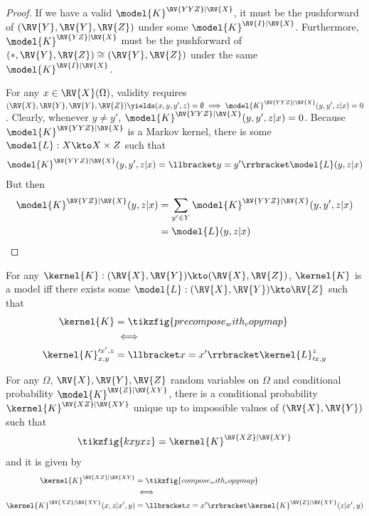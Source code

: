 \begin{proof}
If we have a valid $\model{K}^{\RV{YYZ}|\RV{X}}$, it must be the pushforward of $(\RV{Y},\RV{Y},\RV{Z})$ under some $\model{K}^{\RV{I}|\RV{X}}$. Furthermore, $\model{K}^{\RV{YZ}|\RV{X}}$ must be the pushforward of $(*,\RV{Y},\RV{Z})\cong (\RV{Y},\RV{Z})$ under the same $\model{K}^{\RV{I}|\RV{X}}$.

For any $x\in \RV{X}(\Omega)$, validity requires $(\RV{X},\RV{Y},\RV{Y},\RV{Z})\yields (x,y,y',z)=\emptyset \implies \model{K}^{\RV{YYZ}|\RV{X}}(y,y',z|x)=0$. Clearly, whenever $y\neq y'$, $\model{K}^{\RV{YYZ}|\RV{X}}(y,y',z|x)=0$. Because $\model{K}^{\RV{YYZ}|\RV{X}}$ is a Markov kernel, there is some $\model{L}:X\kto X\times Z$ such that
\begin{align}
    \model{K}^{\RV{YYZ}|\RV{X}}(y,y',z|x) = \llbracket y=y' \rrbracket \model{L}(y,z|x)\\
\end{align}
But then
\begin{align}
    \model{K}^{\RV{YZ}|\RV{X}}(y,z|x) &= \sum_{y'\in Y} \model{K}^{\RV{YYZ}|\RV{X}}(y,y',z|x)\\
    &= \model{L}(y,z|x)\\
\end{align}
\end{proof}

\begin{lemma}\label{lem:nocopy2}

For any $\kernel{K}:(\RV{X},\RV{Y})\kto (\RV{X},\RV{Z})$, $\kernel{K}$ is a model iff there exists some $\model{L}:(\RV{X},\RV{Y})\kto \RV{Z}$ such that
\begin{align}
     \kernel{K} &= \tikzfig{precompose_with_copymap}\\
     &\iff\\
     \kernel{K}_{x,y}^{\prime x',z} &= \llbracket x=x'\rrbracket \kernel{L}_{\prime x,y}^{z}
\end{align}

For any $\Omega$, $\RV{X},\RV{Y},\RV{Z}$ random variables on $\Omega$ and conditional probability $\model{K}^{\RV{Z}|\RV{XY}}$, there is a conditional probability $\kernel{K}^{\RV{XZ}|\RV{XY}}$ unique up to impossible values of $(\RV{X},\RV{Y})$ such that
\begin{align}
    \tikzfig{kxyxz} = \kernel{K}^{\RV{XZ}|\RV{XY}}
\end{align}
and it is given by
\begin{align}
        \kernel{K}^{\RV{XZ}|\RV{XY}} &= \tikzfig{compose_with_copymap}\\
        &\iff \\
        \kernel{K}^{\RV{XZ}|\RV{XY}}(x,z|x',y) &= \llbracket x=x' \rrbracket\kernel{K}^{\RV{Z}|\RV{XY}}(z|x',y)\\
\end{align}

\end{lemma}

